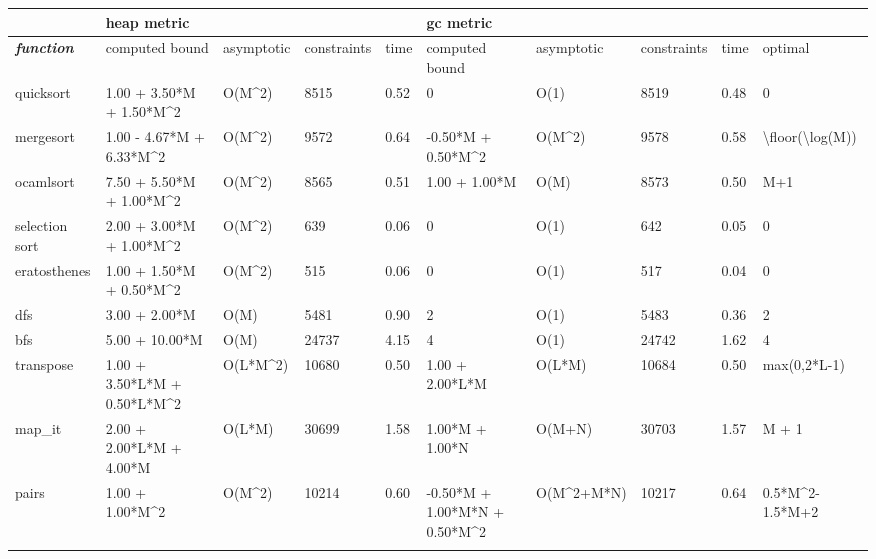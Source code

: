 \documentclass{easychair}
\newcounter{rule}
\theoremstyle{definition}
\begin{document}
\begin{table}[]
	\begin{adjustbox}{width=1.2\textwidth,center=\textwidth}
  \begin{tabular}{@{}llllllllll@{}}
		\toprule
		 & \multicolumn{4}{l}{heap metric} & \multicolumn{4}{l}{gc metric} &  \\ \midrule
		 \textit{\textbf{function}} & computed bound & asymptotic & constraints & time & computed bound & asymptotic & constraints & time & optimal \\
		 quicksort & 1.00 + 3.50*M + 1.50*M\textasciicircum{}2 & O(M\textasciicircum{}2) & 8515 & 0.52 & 0 & O(1) & 8519 & 0.48 & 0 \\
		 mergesort & 1.00 - 4.67*M + 6.33*M\textasciicircum{}2 & O(M\textasciicircum{}2) & 9572 & 0.64 & -0.50*M + 0.50*M\textasciicircum{}2 & O(M\textasciicircum{}2) & 9578 & 0.58 & \textbackslash{}floor(\textbackslash{}log(M)) \\
		 ocamlsort & 7.50 + 5.50*M + 1.00*M\textasciicircum{}2 & O(M\textasciicircum{}2) & 8565 & 0.51 & 1.00 + 1.00*M & O(M) & 8573 & 0.50 & M+1 \\
		 selection sort & 2.00 + 3.00*M + 1.00*M\textasciicircum{}2 & O(M\textasciicircum{}2) & 639 & 0.06 & 0 & O(1) & 642 & 0.05 & 0 \\
		 eratosthenes & 1.00 + 1.50*M + 0.50*M\textasciicircum{}2 & O(M\textasciicircum{}2) & 515 & 0.06 & 0 & O(1) & 517 & 0.04 & 0 \\
		 dfs & 3.00 + 2.00*M & O(M) & 5481 & 0.90 & 2 & O(1) & 5483 & 0.36 & 2 \\
		 bfs & 5.00 + 10.00*M & O(M) & 24737 & 4.15 & 4 & O(1) & 24742 & 1.62 & 4 \\
		 transpose & 1.00 + 3.50*L*M + 0.50*L*M\textasciicircum{}2 & O(L*M\textasciicircum{}2) & 10680 & 0.50 & 1.00 + 2.00*L*M & O(L*M) & 10684 & 0.50 & max(0,2*L-1) \\
		 map\_it & 2.00 + 2.00*L*M + 4.00*M & O(L*M) & 30699 & 1.58 & 1.00*M + 1.00*N & O(M+N) & 30703 & 1.57 & M + 1 \\
		 pairs & 1.00 + 1.00*M\textasciicircum{}2 & O(M\textasciicircum{}2) & 10214 & 0.60 & -0.50*M + 1.00*M*N + 0.50*M\textasciicircum{}2 & O(M\textasciicircum{}2+M*N) & 10217 & 0.64 & 0.5*M\textasciicircum{}2-1.5*M+2 \\
		  &  &  &  &  &  &  &  &  &  \\ \bottomrule
	\end{tabular}
	\end{adjustbox}
\end{table}
\end{document}
